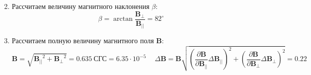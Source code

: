 \documentclass[a4paper, 10pt]{article}
\begin{document}
\begin{enumerate}
\begin{equation*}
    \end{equation*}
    \item Рассчитаем величину магнитного наклонения $\beta$:
    \begin{equation*}
            \beta = \arctan{\frac{\mathbf{B_{\perp}}}{\mathbf{B_{||}}}} = 82^\circ
    \end{equation*}
    \item Рассчитаем полную величину магнитного поля $\mathbf{B}$:
    \begin{equation*}
        \mathbf{B} = \sqrt{\mathbf{B_{||}}^{2} + \mathbf{B_{\perp}}^{2}} = 0.635\ \text{СГС} = 6.35\cdot 10^{-5}\ \text{} \quad
        \Delta \mathbf{B} = \mathbf{B}\sqrt{\left(\frac{\partial \mathbf{B}}{\partial \mathbf{B_{||}}}\Delta \mathbf{B_{||}}\right)^{2} + \left(\frac{\partial \mathbf{B}}{\partial \mathbf{B_{\perp}}}\Delta \mathbf{B_{\perp}}\right)^{2}} = 0.22\ \text{}
    \end{equation*}
\end{enumerate}
\end{document}
